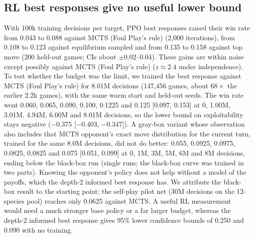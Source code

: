 \documentclass[10pt]{article}
\theoremstyle{plain}
\theoremstyle{definition}
\theoremstyle{remark}
\begin{document}
\subsection{RL best responses give no useful lower bound}
\label{sec:exp-rl}
With 100k training decisions per target, PPO best responses raised their win rate from 0.043 to 0.088 against MCTS (Foul Play's rule) (2,000 iterations), from 0.108 to 0.123 against equilibrium sampled and from 0.135 to 0.158 against top move (200 held-out games; CIs about $\pm0.02$--$0.04$). These gains are within noise except possibly against MCTS (Foul Play's rule) ($z\approx2.4$ under independence). To test whether the budget was the limit, we trained the best response against MCTS (Foul Play's rule) for 8.01M decisions (147,456 games, about $68\times$ the earlier 2.2k games), with the same warm start and held-out seeds. The win rate went 0.060, 0.065, 0.090, 0.100, 0.1225 and 0.125 [0.097, 0.153] at 0, 1.00M, 3.01M, 4.94M, 6.00M and 8.01M decisions, so the lower bound on exploitability stays negative ($-0.375$ [$-0.403$, $-0.347$]). A gray-box variant whose observation also includes that MCTS opponent's exact move distribution for the current turn, trained for the same 8.0M decisions, did not do better: 0.055, 0.0925, 0.0975, 0.0825, 0.0825 and 0.075 [0.051, 0.099] at 0, 1M, 3M, 5M, 6M and 8M decisions, ending below the black-box run (single runs; the black-box curve was trained in two parts). Knowing the opponent's policy does not help without a model of the payoffs, which the depth-2 informed best response has. We attribute the black-box result to the starting point: the self-play pilot net (30M decisions on the 12-species pool) reaches only 0.0625 against MCTS. A useful RL measurement would need a much stronger base policy or a far larger budget, whereas the depth-2 informed best response gives 95\% lower confidence bounds of 0.250 and 0.090 with no training.
\end{document}
